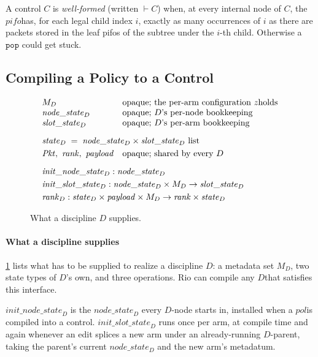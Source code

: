 \documentclass[sigplan,anonymous,review,nonacm]{acmart}
\newcommand{\pop}{\ensuremath{\mathtt{pop}}}
\newcommand{\notation}[1]{\ensuremath{#1}\ifmmode\else\xspace\fi}
\newcommand{\pol}{\notation{\mathit{pol}}}
\newcommand{\pifo}{\notation{\mathit{pifo}}}
\newcommand{\zz}{\notation{\mathit{z}}}
\newcommand{\disc}{\notation{D}}
\begin{document}
A control \(C\) is \emph{well-formed} (written \(\vdash C\)) when, at every internal node of \(C\), the \pifo has, for each legal child index \(i\), exactly as many occurrences of \(i\) as there are packets stored in the leaf pifos of the subtree under the \(i\)-th child.
Otherwise a \pop{} could get stuck.

\subsection{Compiling a Policy to a Control}\label{sec:compilation}

\begin{figure}[t]
\small
\[
\begin{array}{@{}l@{\quad}l@{}}
M_{D} & \text{opaque; the per-arm configuration \zz holds}\\
\mathit{node\_state}_{D} & \text{opaque; \disc's per-node bookkeeping}\\
\mathit{slot\_state}_{D} & \text{opaque; \disc's per-arm bookkeeping}\\[9pt]
\multicolumn{2}{@{}l@{}}{\mathit{state}_{D} \;=\; \mathit{node\_state}_{D} \times \mathit{slot\_state}_{D}\ \mathrm{list}}\\[3pt]
\mathit{Pkt},\ \mathit{rank},\ \mathit{payload} & \text{opaque; shared by every \disc}\\[9pt]
\multicolumn{2}{@{}l@{}}{\mathit{init\_node\_state}_{D} : \mathit{node\_state}_{D}}\\[3pt]
\multicolumn{2}{@{}l@{}}{\mathit{init\_slot\_state}_{D} : \mathit{node\_state}_{D} \times M_{D} \to \mathit{slot\_state}_{D}}\\[3pt]
\multicolumn{2}{@{}l@{}}{\mathit{rank}_{D} : \mathit{state}_{D} \times \mathit{payload} \times M_{D} \to \mathit{rank} \times \mathit{state}_{D}}
\end{array}
\]
\caption{What a discipline \(D\) supplies.}
\label{fig:discipline}
\end{figure}

\paragraph{What a discipline supplies}

\cref{fig:discipline} lists what has to be supplied to realize a discipline \disc: a metadata set \(M_{D}\), two state types of \disc's own, and three operations.
Rio can compile any \disc that satisfies this interface.

\(\mathit{init\_node\_state}_{D}\) is the \(\mathit{node\_state}_{D}\) every \disc-node starts in, installed when a \pol is compiled into a control.
\(\mathit{init\_slot\_state}_{D}\) runs once per arm, at compile time and again whenever an edit splices a new arm under an already-running \disc-parent, taking the parent's current \(\mathit{node\_state}_{D}\) and the new arm's metadatum.
\end{document}
